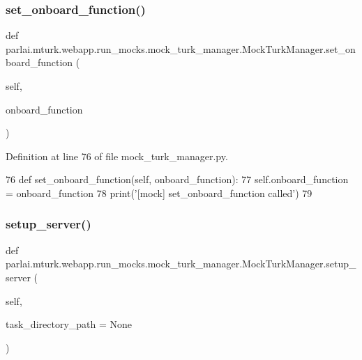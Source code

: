 \subsubsection{\texorpdfstring{set\+\_\+onboard\+\_\+function()}{set\_onboard\_function()}}
{\footnotesize\ttfamily def parlai.\+mturk.\+webapp.\+run\+\_\+mocks.\+mock\+\_\+turk\+\_\+manager.\+Mock\+Turk\+Manager.\+set\+\_\+onboard\+\_\+function (\begin{DoxyParamCaption}\item[{}]{self,  }\item[{}]{onboard\+\_\+function }\end{DoxyParamCaption})}



Definition at line 76 of file mock\+\_\+turk\+\_\+manager.\+py.


\begin{DoxyCode}
76     \textcolor{keyword}{def }set\_onboard\_function(self, onboard\_function):
77         self.onboard\_function = onboard\_function
78         print(\textcolor{stringliteral}{'[mock] set\_onboard\_function called'})
79 
\end{DoxyCode}
\mbox{\label{classparlai_1_1mturk_1_1webapp_1_1run__mocks_1_1mock__turk__manager_1_1MockTurkManager_ae2964afb8cf024568b9a4a06c83411b0}} 
\subsubsection{\texorpdfstring{setup\+\_\+server()}{setup\_server()}}
{\footnotesize\ttfamily def parlai.\+mturk.\+webapp.\+run\+\_\+mocks.\+mock\+\_\+turk\+\_\+manager.\+Mock\+Turk\+Manager.\+setup\+\_\+server (\begin{DoxyParamCaption}\item[{}]{self,  }\item[{}]{task\+\_\+directory\+\_\+path = {\ttfamily None} }\end{DoxyParamCaption})}

